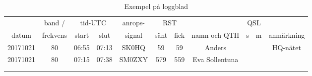 \begin{table*}[b]
  \begin{center}
    \begin{tabular}{|c|c|c|c|c|c|c|c|c|c|c|}
      \hline
      & band / & \multicolumn{2}{|c|}{tid-UTC} & anrops- & \multicolumn{2}{|c|}{RST} & &
      \multicolumn{2}{|c|}{QSL} & \\
      datum & frekvens & start & slut & signal & sänt & fick & namn och QTH & s & m & anmärkning \\
      \hline
      \hline
      20171021 & 80 & 06:55 & 07:13 & SK0HQ & 59 & 59 & Anders & & & HQ-nätet \\
      \hline
      20171021 & 80 & 07:15 & 07:38 & SM0ZXY & 579 & 559 & Eva Sollentuna & & & \\
      \hline
      & & & & & & & & & & \\
      \hline
      & & & & & & & & & & \\
      \hline
    \end{tabular}
    \caption{Exempel på loggblad}
    \label{tab:loggblad}
  \end{center}
\end{table*}

